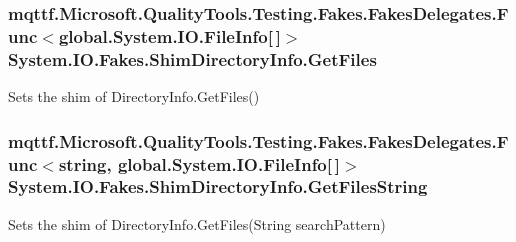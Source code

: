\hypertarget{class_system_1_1_i_o_1_1_fakes_1_1_shim_directory_info_a53e206e13345c6a078b1db7f1ef1b651}{
\subsubsection[{Get\-Files}]{\setlength{\rightskip}{0pt plus 5cm}mqttf.\-Microsoft.\-Quality\-Tools.\-Testing.\-Fakes.\-Fakes\-Delegates.\-Func$<$global.\-System.\-I\-O.\-File\-Info\mbox{[}$\,$\mbox{]}$>$ System.\-I\-O.\-Fakes.\-Shim\-Directory\-Info.\-Get\-Files\hspace{0.3cm}{\ttfamily [set]}}}\label{class_system_1_1_i_o_1_1_fakes_1_1_shim_directory_info_a53e206e13345c6a078b1db7f1ef1b651}


Sets the shim of Directory\-Info.\-Get\-Files()

\hypertarget{class_system_1_1_i_o_1_1_fakes_1_1_shim_directory_info_a0879b480cce9e5a7b5419764765a749b}{
\subsubsection[{Get\-Files\-String}]{\setlength{\rightskip}{0pt plus 5cm}mqttf.\-Microsoft.\-Quality\-Tools.\-Testing.\-Fakes.\-Fakes\-Delegates.\-Func$<$string, global.\-System.\-I\-O.\-File\-Info\mbox{[}$\,$\mbox{]}$>$ System.\-I\-O.\-Fakes.\-Shim\-Directory\-Info.\-Get\-Files\-String\hspace{0.3cm}{\ttfamily [set]}}}\label{class_system_1_1_i_o_1_1_fakes_1_1_shim_directory_info_a0879b480cce9e5a7b5419764765a749b}


Sets the shim of Directory\-Info.\-Get\-Files(\-String search\-Pattern)

